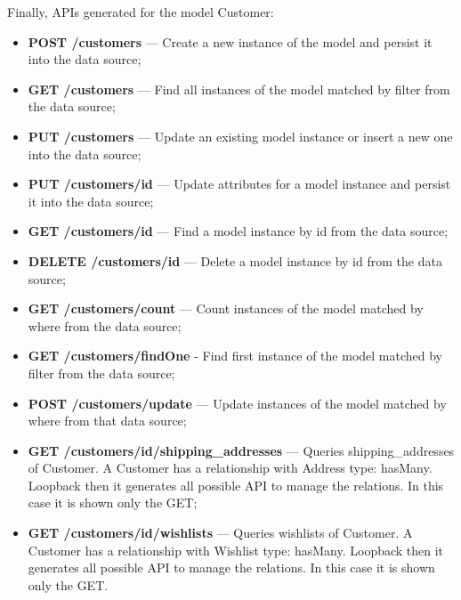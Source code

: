 Finally, APIs generated for the model Customer:
\begin{itemize}
\item \textbf{POST /customers} — Create a new instance of the model and persist it into the data source;
\item \textbf{GET /customers} —  Find all instances of the model matched by filter from the data source;
\item \textbf{PUT /customers} — Update an existing model instance or insert a new one into the data source;
\item \textbf{PUT /customers/id} — Update attributes for a model instance and persist it into the data source;
\item \textbf{GET /customers/id} — Find a model instance by id from the data source;
\item \textbf{DELETE /customers/id} — Delete a model instance by id from the data source;
\item \textbf{GET  /customers/count} — Count instances of the model matched by where from the data source;
\item \textbf{GET /customers/findOne}  - Find first instance of the model matched by filter from the data source;
\item \textbf{POST /customers/update} — Update instances of the model matched by where from that data source;
\item \textbf{GET /customers/id/shipping\_addresses} — Queries shipping\_addresses of Customer. A Customer has a relationship with Address type: hasMany. Loopback then it generates all possible API to manage the relations. In this case it is shown only the GET;
\item \textbf{GET  /customers/id/wishlists} — Queries wishlists of Customer. A Customer has a relationship with Wishlist type: hasMany. Loopback then it generates all possible API to manage the relations. In this case it is shown only the GET.
\end{itemize}
